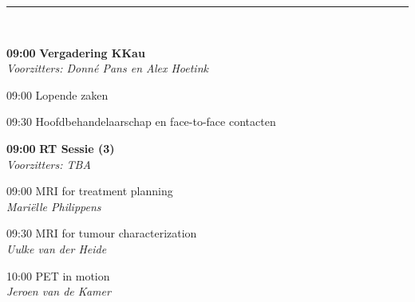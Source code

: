 \documentclass[a4paper,10pt]{report}
\begin{document}
\begin{multicols*}{3}
\vfill
\hrule\vspace{3mm}

{}\\
\vfill
{}
\begin{packed_enum}
\item[\textbf{09:00}] \textbf{Vergadering KKau}\\\textit{Voorzitters: Donn\'e Pans en Alex Hoetink}
\item[09:00] Lopende zaken
\item[09:30] Hoofdbehandelaarschap en face-to-face contacten 
\end{packed_enum}
\columnbreak

\begin{packed_enum}
\item[\textbf{09:00}] \textbf{RT Sessie (3)}\\\textit{Voorzitters: TBA}
\item[09:00] MRI for treatment planning\\\textit{Mariëlle Philippens}
\item[09:30] MRI for tumour characterization\\\textit{Uulke van der Heide}
\item[10:00] PET in motion\\\textit{Jeroen van de Kamer}
\end{packed_enum}


\end{multicols*}
\end{document}
